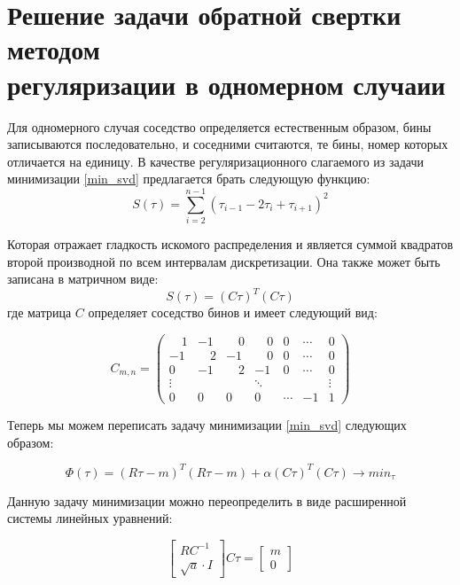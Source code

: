 \documentclass[a4paper,12pt]{diplom}
\begin{document}
\section[Одномерный случай]{Решение задачи обратной свертки методом \\ регуляризации в одномерном случаии}

Для одномерного случая соседство определяется естественным образом, бины записываются последовательно, и соседними считаются, те бины, номер 
которых отличается на единицу. В качестве регуляризационного слагаемого из задачи минимизации \eqref{min_svd} предлагается брать следующую функцию:
\begin{equation}
    S(\tau)= \sum_{i=2}^{n-1} (\tau_{i-1} - 2\tau_{i} + \tau_{i+1})^2
\end{equation}

Которая отражает гладкость искомого распределения и является суммой квадратов второй производной по всем интервалам дискретизации. 
Она также может быть записана в матричном виде:
\begin{equation}
    S(\tau) = (C\tau)^T(C\tau)
\end{equation}
где матрица $C$ определяет соседство бинов и имеет следующий вид:

\begin{equation}
    C_{m,n} = 
 \begin{pmatrix}
   \quad 1 &       -1 &  \quad 0 &  \quad 0 & 0 & \cdots & 0 \\
        -1 &  \quad 2 &       -1 &  \quad 0 & 0 & \cdots & 0 \\
         0 &       -1 & \quad  2 &       -1 & 0 & \cdots & 0 \\
  \vdots &  & & \ddots & & & \vdots \\
  0  & 0  & 0 & 0 & \cdots & -1 & 1
 \end{pmatrix}
 \label{one_dim_neighbors_mat}
\end{equation}

Теперь мы можем переписать задачу минимизации \eqref{min_svd} следующих образом:

\begin{equation}
 \Phi(\tau)=(R\tau-m)^T (R\tau-m) + \alpha(C\tau)^T(C\tau) \to min_{\tau}
 \label{min_one_dim}
\end{equation}

Данную задачу минимизации можно переопределить в виде расширенной системы линейных уравнений:

\begin{equation}
    \begin{bmatrix}
        RC^{-1} \\
        \sqrt{a} \cdot I
    \end{bmatrix}
    C\tau = 
    \begin{bmatrix}
        m \\
        0
    \end{bmatrix}
    \label{system_one_dim}
\end{equation}
\end{document}
